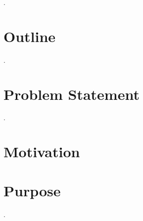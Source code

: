 \par \lipsum.

\section{Outline}
\lipsum.

\lipsum

\section{Problem Statement}
\lipsum.

\section{Motivation}
\lipsum

\section{Purpose}
\lipsum.


